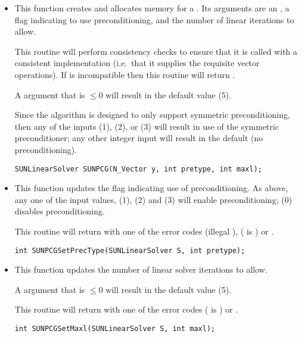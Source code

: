 \begin{itemize}


\item {}

  This function creates and allocates memory for a {\pcg}
  .  Its arguments are an {\nvector}, a flag
  indicating to use preconditioning, and the number of linear
  iterations to allow. 

  This routine will perform consistency checks to ensure that it is
  called with a consistent {\nvector} implementation (i.e.~that it
  supplies the requisite vector operations).  If  is
  incompatible then this routine will return .

  A  argument that is $\le0$ will result in the default
  value (5).

  Since the {\pcg} algorithm is designed to only support symmetric
  preconditioning, then any of the  inputs 
  (1),  (2), or  (3) will result in use
  of the symmetric preconditioner;  any other integer input will
  result in the default (no preconditioning).

  \verb|SUNLinearSolver SUNPCG(N_Vector y, int pretype, int maxl);|


\item {}

  This function updates the flag indicating use of preconditioning.
  As above, any one of the input values,  (1),
   (2) and  (3) will enable
  preconditioning;  (0) disables preconditioning.

  This routine will return with one of the error codes
   (illegal ), 
  ( is ) or .
  
  \verb|int SUNPCGSetPrecType(SUNLinearSolver S, int pretype);|


\item {}

  This function updates the number of linear solver iterations to
  allow. 

  A  argument that is $\le0$ will result in the default
  value (5).

  This routine will return with one of the error codes
   ( is ) or .
  
  \verb|int SUNPCGSetMaxl(SUNLinearSolver S, int maxl);|

\end{itemize}
